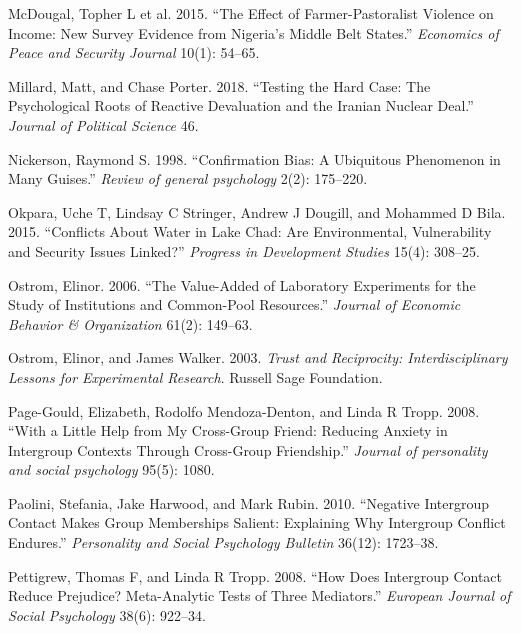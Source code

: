 \documentclass[11pt]{article}
\begin{document}
\leavevmode\hypertarget{ref-mcdougal2015effect}{}%
McDougal, Topher L et al. 2015. ``The Effect of Farmer-Pastoralist
Violence on Income: New Survey Evidence from Nigeria's Middle Belt
States.'' \emph{Economics of Peace and Security Journal} 10(1): 54--65.

\leavevmode\hypertarget{ref-millard2018testing}{}%
Millard, Matt, and Chase Porter. 2018. ``Testing the Hard Case: The
Psychological Roots of Reactive Devaluation and the Iranian Nuclear
Deal.'' \emph{Journal of Political Science} 46.

\leavevmode\hypertarget{ref-nickerson1998confirmation}{}%
Nickerson, Raymond S. 1998. ``Confirmation Bias: A Ubiquitous Phenomenon
in Many Guises.'' \emph{Review of general psychology} 2(2): 175--220.

\leavevmode\hypertarget{ref-okpara2015conflicts}{}%
Okpara, Uche T, Lindsay C Stringer, Andrew J Dougill, and Mohammed D
Bila. 2015. ``Conflicts About Water in Lake Chad: Are Environmental,
Vulnerability and Security Issues Linked?'' \emph{Progress in
Development Studies} 15(4): 308--25.

\leavevmode\hypertarget{ref-ostrom2006value}{}%
Ostrom, Elinor. 2006. ``The Value-Added of Laboratory Experiments for
the Study of Institutions and Common-Pool Resources.'' \emph{Journal of
Economic Behavior \& Organization} 61(2): 149--63.

\leavevmode\hypertarget{ref-ostrom2003trust}{}%
Ostrom, Elinor, and James Walker. 2003. \emph{Trust and Reciprocity:
Interdisciplinary Lessons for Experimental Research}. Russell Sage
Foundation.

\leavevmode\hypertarget{ref-page2008little}{}%
Page-Gould, Elizabeth, Rodolfo Mendoza-Denton, and Linda R Tropp. 2008.
``With a Little Help from My Cross-Group Friend: Reducing Anxiety in
Intergroup Contexts Through Cross-Group Friendship.'' \emph{Journal of
personality and social psychology} 95(5): 1080.

\leavevmode\hypertarget{ref-paolini2010negative}{}%
Paolini, Stefania, Jake Harwood, and Mark Rubin. 2010. ``Negative
Intergroup Contact Makes Group Memberships Salient: Explaining Why
Intergroup Conflict Endures.'' \emph{Personality and Social Psychology
Bulletin} 36(12): 1723--38.

\leavevmode\hypertarget{ref-pettigrew2008does}{}%
Pettigrew, Thomas F, and Linda R Tropp. 2008. ``How Does Intergroup
Contact Reduce Prejudice? Meta-Analytic Tests of Three Mediators.''
\emph{European Journal of Social Psychology} 38(6): 922--34.
\end{document}

